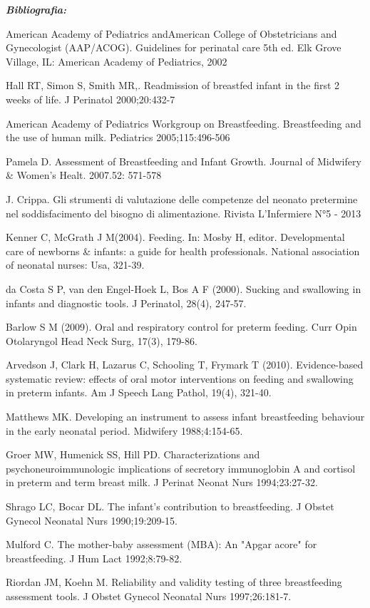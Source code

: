 \documentclass[]{article}
\begin{document}
\emph{\textbf{Bibliografia:}}

American Academy of Pediatrics andAmerican College of Obstetricians and
Gynecologist (AAP/ACOG). Guidelines for perinatal care 5th ed. Elk Grove
Village, IL: American Academy of Pediatrics, 2002

Hall RT, Simon S, Smith MR,. Readmission of breastfed infant in the
first 2 weeks of life. J Perinatol 2000;20:432-7

American Academy of Pediatrics Workgroup on Breastfeeding. Breastfeeding
and the use of human milk. Pediatrics 2005;115:496-506

Pamela D. Assessment of Breastfeeding and Infant Growth. Journal of
Midwifery \& Women's Healt. 2007.52: 571-578

J. Crippa. Gli strumenti di valutazione delle competenze del neonato
pretermine nel soddisfacimento del bisogno di alimentazione. Rivista
L'Infermiere N°5 - 2013

Kenner C, McGrath J M(2004). Feeding. In: Mosby H, editor. Developmental
care of newborns \& infants: a guide for health professionals. National
association of neonatal nurses: Usa, 321-39.

da Costa S P, van den Engel-Hoek L, Bos A F (2000). Sucking and
swallowing in infants and diagnostic tools. J Perinatol, 28(4), 247-57.

Barlow S M (2009). Oral and respiratory control for preterm feeding.
Curr Opin Otolaryngol Head Neck Surg, 17(3), 179-86.

Arvedson J, Clark H, Lazarus C, Schooling T, Frymark T (2010).
Evidence-based systematic review: effects of oral motor interventions on
feeding and swallowing in preterm infants. Am J Speech Lang Pathol,
19(4), 321-40.

Matthews MK. Developing an instrument to assess infant breastfeeding
behaviour in the early neonatal period. Midwifery 1988;4:154-65.

Groer MW, Humenick SS, Hill PD. Characterizations and
psychoneuroimmunologic implications of secretory immunoglobin A and
cortisol in preterm and term breast milk. J Perinat Neonat Nurs
1994;23:27-32.

Shrago LC, Bocar DL. The infant's contribution to breastfeeding. J
Obstet Gynecol Neonatal Nurs 1990;19:209-15.

Mulford C. The mother-baby assessment (MBA): An "Apgar acore" for
breastfeeding. J Hum Lact 1992;8:79-82.

Riordan JM, Koehn M. Reliability and validity testing of three
breastfeeding assessment tools. J Obstet Gynecol Neonatal Nurs
1997;26:181-7.
\end{document}
